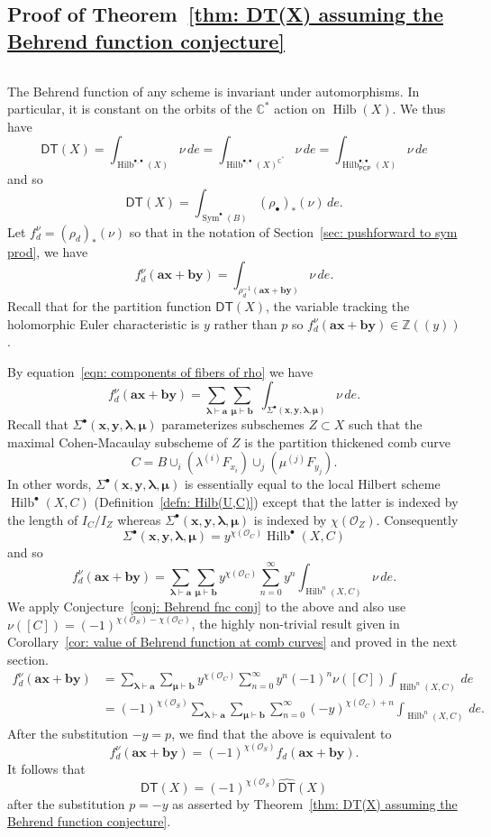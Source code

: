 \documentclass[12pt]{amsart}
\theoremstyle{definition}
\newcommand{\CC} {\mathbb{C}}          %
\newcommand{\ZZ} {\mathbb{Z}}		%
\renewcommand{\O}{\mathcal{O}}
\newcommand{\Sym}{\operatorname{Sym}}
\newcommand{\Hilb}{\operatorname{Hilb}}
\newcommand{\DT}{\mathsf{DT}}
\newcommand{\boldx}{\boldsymbol{x}}
\newcommand{\boldy}{\boldsymbol{y}}
\newcommand{\bolda}{\boldsymbol{a}}
\newcommand{\boldb}{\boldsymbol{b}}
\newcommand{\boldlambda}{\boldsymbol{\lambda }}
\newcommand{\boldmu}{\boldsymbol{\mu }}
\newcommand{\Sigmaxylambdamu}{\Sigma^{\bullet }(\boldx ,\boldy ,\boldlambda ,\boldmu )}
\newcommand{\DThat}{\widehat{\DT}}
\newcommand{\PCP}{\mathsf{PCP}}
\newcommand{\SubSecSpace}{$\,$\vspace{0.2cm}\par } %
\begin{document}
\subsection{Proof of Theorem~\ref{thm: DT(X) assuming the Behrend
function conjecture}}\SubSecSpace 

The Behrend function of any scheme is invariant under
automorphisms. In particular, it is constant on the orbits of the
$\CC^{*}$ action on $\Hilb (X)$. We thus have
\[
\DT (X) = \int_{\Hilb^{\bullet ,\bullet}(X)} \nu \, de =
\int_{\Hilb^{\bullet ,\bullet}(X)^{\CC^{*}}} \nu \, de =
\int_{\Hilb_{\PCP }^{\bullet ,\bullet}(X)} \nu \, de
\]
and so
\[
\DT (X)  =\int_{\Sym^{\bullet}(B)} (\rho_{\bullet})_{*} (\nu )\, de.
\]
Let $f^{\nu}_{d} = (\rho_{d})_{*}(\nu )$ so that in the notation of
Section~\ref{sec: pushforward to sym prod}, we have
\[
f^{\nu}_{d}(\bolda \boldx +\boldb \boldy ) =
\int_{\rho^{-1}_{d}(\bolda \boldx +\boldb \boldy )} \nu \, de.
\]
Recall that for the partition function $\DT (X)$, the variable
tracking the holomorphic Euler characteristic is $y$ rather than $p$
so $f_{d}^{\nu}(\bolda \boldx +\boldb \boldy )\in \ZZ (\!(y)\!)$.

By equation~\eqref{eqn: components of fibers of rho} we have
\[
f_{d}^{\nu}(\bolda \boldx +\boldb \boldy ) = \sum_{\boldlambda \vdash
\bolda} \sum_{\boldmu \vdash \boldb} \,\, \int_{\Sigmaxylambdamu} \nu \, de.
\]
Recall that $\Sigmaxylambdamu$ parameterizes subschemes $Z\subset X$
such that the maximal Cohen-Macaulay subscheme of $Z$ is the partition
thickened comb curve
\[
C=B \cup_{i}\left(\lambda^{(i)}F_{x_{i}} \right) \cup_{j}\left(\mu^{(j)}F_{y_{j}} \right).
\]
In other words, $\Sigmaxylambdamu$ is essentially equal to the local
Hilbert scheme $\Hilb^{\bullet}(X,C)$ (Definition~\ref{defn:
Hilb(U,C)}) except that the latter is indexed by the length of
$I_{C}/I_{Z}$ whereas $\Sigmaxylambdamu$ is indexed by $\chi
(\O_{Z})$. Consequently
\[
\Sigmaxylambdamu  = y^{\chi (\O_{C})} \Hilb^{\bullet}(X,C)
\]
and so 
\[
f_{d}^{\nu}(\bolda \boldx +\boldb \boldy ) = \sum_{\boldlambda \vdash
\bolda} \sum_{\boldmu \vdash \boldb} y^{\chi
(\O_{C})}\sum_{n=0}^{\infty}y^{n} \int_{\Hilb^{n}(X,C)} \nu \, de.
\]
We apply Conjecture~\ref{conj: Behrend fnc conj} to the above and also
use $\nu ([C]) = (-1)^{\chi (\O_{S})-\chi (\O_{C})}$, the highly
non-trivial result given in Corollary~\ref{cor: value of Behrend
function at comb curves} and proved in the next section. 
\begin{align*}
f_{d}^{\nu}(\bolda \boldx +\boldb \boldy )& = \sum_{\boldlambda \vdash
\bolda} \sum_{\boldmu \vdash \boldb} y^{\chi
(\O_{C})}\sum_{n=0}^{\infty} y^{n}(-1)^{n}\nu ([C]) \int_{\Hilb^{n}(X,C)}  \, de\\
&=(-1)^{\chi (\O_{S})} \sum_{\boldlambda \vdash \bolda} \sum_{\boldmu
\vdash \boldb} \sum_{n=0}^{\infty} (-y)^{\chi (\O_{C})+n}
\int_{\Hilb^{n}(X,C)} \, de.
\end{align*}
After the substitution $-y=p$, we find that the above is equivalent to 
\[
f^{\nu}_{d}(\bolda \boldx +\boldb \boldy ) = (-1)^{\chi (\O_{S})}
f_{d}(\bolda \boldx +\boldb \boldy ).
\]
It follows that 
\[
\DT (X) = (-1)^{\chi (\O_{S})} \DThat (X)
\]
after the substitution $p=-y$ as asserted by Theorem~\ref{thm: DT(X)
assuming the Behrend function conjecture}.
\end{document}
